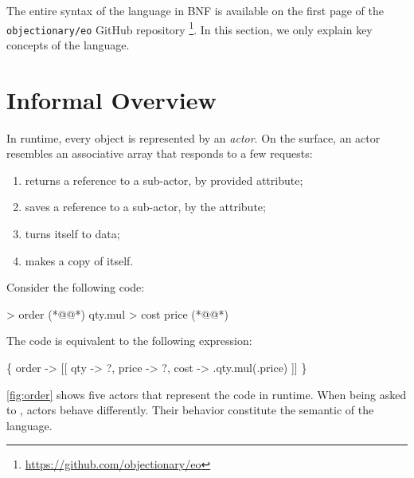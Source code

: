 


The entire syntax of the \eolang{} language in BNF is available on the first page of the \texttt{objectionary/eo} GitHub repository%
  \footnote{\url{https://github.com/objectionary/eo}}.
In this section, we only explain key concepts of the language.

\section{Informal Overview}

In runtime, every \eolang{} object is represented by an \emph{actor}.
On the surface, an actor resembles an associative array that responds to a few requests:
\begin{enumerate}
  \item {} returns a reference to a sub-actor, by provided attribute;
  \item {} saves a reference to a sub-actor, by the attribute;
  \item {} turns itself to data;
  \item {} makes a copy of itself.
\end{enumerate}

Consider the following code:

\begin{ffcode}
 > order (*@\label{ln:order-start}@*)
  qty.mul > cost
    price (*@\label{ln:order-stop}@*)
\end{ffcode}

The code is equivalent to the following \phic{} expression:
\begin{phiquation*}
\Big\{ order -> [[ qty -> ?, price -> ?, cost -> \xi.qty.mul(\xi.price) ]] \Big\}
\end{phiquation*}

\cref{fig:order} shows five actors that represent the code in runtime.
When being asked to , actors behave differently.
Their behavior constitute the semantic of the language.

